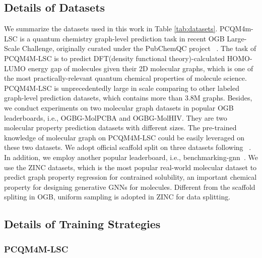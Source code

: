 \documentclass{article}
\begin{document}
\subsection{Details of Datasets}
We summarize the datasets used in this work in Table \ref{tab:datasets}. PCQM4m-LSC is a quantum chemistry graph-level prediction task in recent OGB Large-Scale Challenge, originally curated under the PubChemQC project ~\cite{nakata2017pubchemqc}. The task of PCQM4M-LSC is to predict DFT(density functional theory)-calculated HOMO-LUMO energy gap of molecules given their 2D molecular graphs, which is one of the most practically-relevant quantum chemical properties of molecule science. PCQM4M-LSC is unprecedentedly large in scale comparing to other labeled graph-level prediction datasets, which contains more than 3.8M graphs. Besides, we conduct experiments on two molecular graph datasets in popular OGB leaderboards, i.e., OGBG-MolPCBA and OGBG-MolHIV. They are two molecular property prediction datasets with different sizes. The pre-trained knowledge of molecular graph on PCQM4M-LSC could be easily leveraged on these two datasets. We adopt official scaffold split on three datasets following ~\cite{hu2021ogb,hu2020open}. In addition, we employ another popular leaderboard, i.e., benchmarking-gnn~\cite{dwivedi2020benchmarking}. We use the ZINC datasets, which is the most popular real-world molecular dataset to predict graph property regression for contrained solubility, an important chemical property for designing generative GNNs for molecules. Different from the scaffold spliting in OGB, uniform sampling is adopted in ZINC for data splitting.



\subsection{Details of Training Strategies}


\subsubsection{PCQM4M-LSC}
\end{document}
